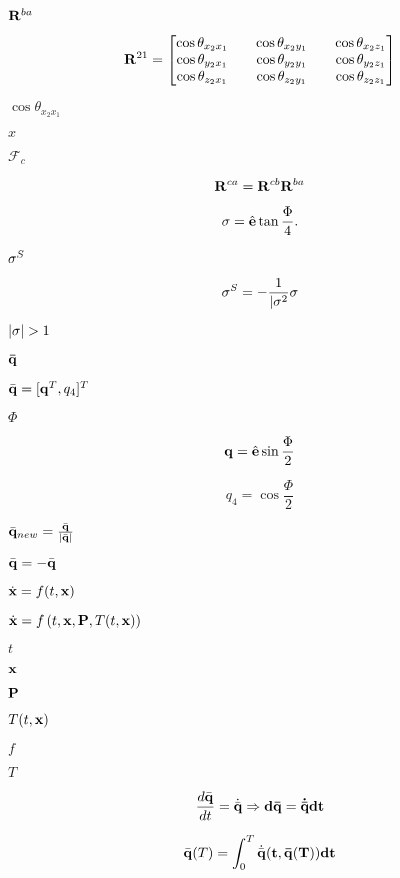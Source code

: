 \documentclass{article}
\begin{document}
${\bf R}^{ba}$
\pagebreak

\[ {\bf R}^{21} = \begin{bmatrix} \cos{\theta_{x_{2}x_{1}}} && \cos{\theta_{x_{2}y_{1}}} && \cos{\theta_{x_{2}z_{1}}}\\ \cos{\theta_{y_{2}x_{1}}} && \cos{\theta_{y_{2}y_{1}}} && \cos{\theta_{y_{2}z_{1}}}\\ \cos{\theta_{z_{2}x_{1}}} && \cos{\theta_{z_{2}y_{1}}} && \cos{\theta_{z_{2}z_{1}}}\end{bmatrix} \]
\pagebreak

$\cos{\theta_{x_{2}x_{1}}}$
\pagebreak

$x$
\pagebreak

$\mathcal{F}_{c}$
\pagebreak

\[ {\bf R}^{ca} = {\bf R}^{cb}{\bf R}^{ba} \]
\pagebreak

\[ {\bf \sigma} = \hat{\bf e}\tan{\frac{\Phi }{4}}. \]
\pagebreak

${\bf \sigma}^{S}$
\pagebreak

\[ {\bf \sigma}^{S} = -\frac{1}{|{\bf \sigma}^{2}}{\bf \sigma} \]
\pagebreak

$|{\bf \sigma}| > 1$
\pagebreak

${\bf{\bar q}}$
\pagebreak

$\bar{\bf q}=[{\bf q}^{T}, q_{4}]^{T}$
\pagebreak

$\Phi $
\pagebreak

\[{\bf{q}} = \hat{\bf e}\sin \frac{\Phi}{2}\]
\pagebreak

\[q_4 = \cos \frac{\Phi }{2}\]
\pagebreak

$\bar{\bf q}_{new}=\frac{\bar{\bf q}}{|\bar{\bf q}|}$
\pagebreak

$\bar{\bf q}=-\bar{\bf q}$
\pagebreak

$\dot{\bf x}=f(t,{\bf x})$
\pagebreak

$\dot{\bf x} = f\left(t,{\bf x}, {\bf P}, T(t, {\bf x})\right)$
\pagebreak

$t$
\pagebreak

${\bf x}$
\pagebreak

${\bf P}$
\pagebreak

$T(t, {\bf x})$
\pagebreak

$f$
\pagebreak

$T$
\pagebreak

\[\frac{d\bar{\bf q}}{dt} = \dot{\bar{\bf q}} \Rightarrow d\bar{\bf q} = \dot{\bar{\bf q}} dt\]
\pagebreak

\[ \bar{\bf q}(T) = \int^{T}_{0}{\dot{\bar{\bf q}}(t, \bar{\bf q}(T)) dt} \]
\pagebreak
\end{document}
